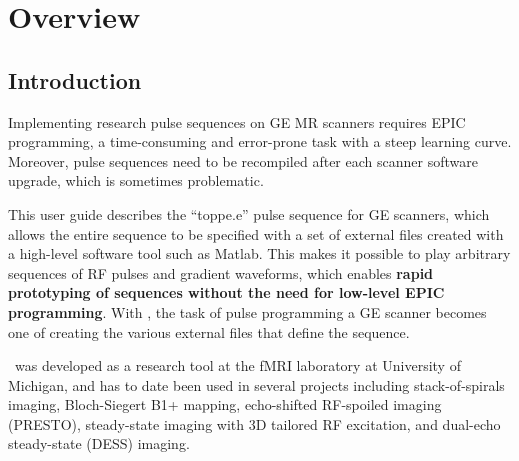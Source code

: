 

\chapter{Overview}
\setcounter{page}{1}

\section{Introduction}
Implementing research pulse sequences on GE MR scanners requires EPIC programming, a time-consuming and error-prone task with a steep learning curve.
Moreover, pulse sequences need to be recompiled after each scanner software upgrade, which is sometimes problematic.

This user guide describes the ``toppe.e'' pulse sequence for GE scanners, which allows the entire sequence to be specified with a set of external files created with a high-level software tool such as Matlab.
This makes it possible to play arbitrary sequences of RF pulses and gradient waveforms, which enables \textbf{rapid prototyping of sequences without the need for low-level EPIC programming}.
With \toppe, the task of pulse programming a GE scanner becomes one of creating the various external files that define the sequence.


\toppe~was developed as a research tool at the fMRI laboratory at University of Michigan, and has to date been used in several projects including stack-of-spirals imaging, Bloch-Siegert B1+ mapping, echo-shifted RF-spoiled imaging (PRESTO), steady-state imaging with 3D tailored RF excitation, and dual-echo steady-state (DESS) imaging.

